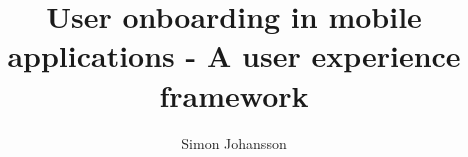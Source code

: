 \documentclass[runningheads, a4paper, oribibl]{config/llncs}
\begin{document}
\pagestyle{headings}

\mainmatter

\title{User onboarding in mobile applications - A user experience framework
}

\author{Simon Johansson}


\maketitle

\begin{abstract}
  
\end{abstract}




\end{document}
